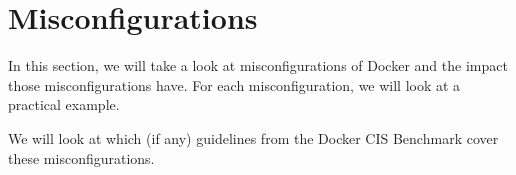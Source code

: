 \section{Misconfigurations}\label{section:misconfigurations}
In this section, we will take a look at misconfigurations of Docker and the impact those misconfigurations have. For each misconfiguration, we will look at a practical example.

\medskip

We will look at which (if any) guidelines from the Docker CIS Benchmark cover these misconfigurations.








